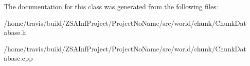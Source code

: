 The documentation for this class was generated from the following files\-:\begin{DoxyCompactItemize}
\item 
/home/travis/build/\-Z\-S\-A\-Inf\-Project/\-Project\-No\-Name/src/world/chunk/Chunk\-Database.\-h\item 
/home/travis/build/\-Z\-S\-A\-Inf\-Project/\-Project\-No\-Name/src/world/chunk/Chunk\-Database.\-cpp\end{DoxyCompactItemize}

